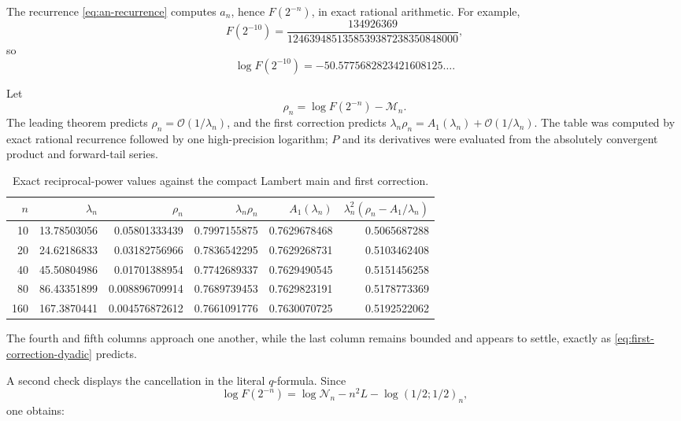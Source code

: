 \documentclass[11pt,oneside]{article}
\theoremstyle{definition}
\theoremstyle{remark}
\newcommand{\bigO}{\mathcal O}
\begin{document}
The recurrence \eqref{eq:an-recurrence} computes $a_n$, hence $F(2^{-n})$, in exact rational
arithmetic.  For example,
\begin{equation}
 F(2^{-10})=
 \frac{134926369}{1246394851358539387238350848000},         \label{eq:F10}
\end{equation}
so
\begin{equation*}
 \log F(2^{-10})=-50.5775682823421608125\ldots.
\end{equation*}

Let
\begin{equation}
 \rho_n=\log F(2^{-n})-\mathcal M_n.                        \label{eq:rho}
\end{equation}
The leading theorem predicts $\rho_n=\bigO(1/\lambda_n)$, and the first correction predicts
$\lambda_n\rho_n=A_1(\lambda_n)+\bigO(1/\lambda_n)$.  The table was computed by exact rational
recurrence followed by one high-precision logarithm; $P$ and its derivatives were evaluated
from the absolutely convergent product and forward-tail series.

\begin{table}[htbp]
\centering
\small
\begin{tabular}{@{}rrrrrr@{}}
\toprule
$n$ & $\lambda_n$ & $\rho_n$ & $\lambda_n\rho_n$
& $A_1(\lambda_n)$ & $\lambda_n^2(\rho_n-A_1/\lambda_n)$\\
\midrule
10  & 13.78503056  & 0.05801333439 & 0.7997155875 & 0.7629678468 & 0.5065687288\\
20  & 24.62186833  & 0.03182756966 & 0.7836542295 & 0.7629268731 & 0.5103462408\\
40  & 45.50804986  & 0.01701388954 & 0.7742689337 & 0.7629490545 & 0.5151456258\\
80  & 86.43351899  & 0.008896709914& 0.7689739453 & 0.7629823191 & 0.5178773369\\
160 & 167.3870441   & 0.004576872612& 0.7661091776 & 0.7630070725 & 0.5192522062\\
\bottomrule
\end{tabular}
\caption{Exact reciprocal-power values against the compact Lambert main and first correction.}
\label{tab:numerics}
\end{table}

The fourth and fifth columns approach one another, while the last column remains bounded and
appears to settle, exactly as \eqref{eq:first-correction-dyadic} predicts.

A second check displays the cancellation in the literal $q$-formula.  Since
\begin{equation*}
 \log F(2^{-n})=\log\mathcal N_n-n^2L-\log(1/2;1/2)_n,
\end{equation*}
one obtains:
\end{document}
